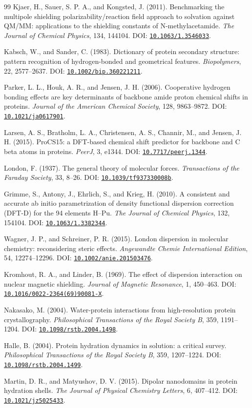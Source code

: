 \documentclass[11pt]{article}
\newcommand{\doi}[1]{\href{https://doi.org/#1}{\nolinkurl{#1}}}
\begin{document}
\begin{thebibliography}{99}
Kjaer, H., Sauer, S. P. A., and Kongsted, J. (2011).
Benchmarking the multipole shielding polarizability/reaction field approach
to solvation against QM/MM: applications to the shielding constants of
N-methylacetamide.
\emph{The Journal of Chemical Physics}, 134, 144104.
DOI: \doi{10.1063/1.3546033}.

Kabsch, W., and Sander, C. (1983).
Dictionary of protein secondary structure: pattern recognition of
hydrogen-bonded and geometrical features.
\emph{Biopolymers}, 22, 2577--2637.
DOI: \doi{10.1002/bip.360221211}.

Parker, L. L., Houk, A. R., and Jensen, J. H. (2006).
Cooperative hydrogen bonding effects are key determinants of backbone amide
proton chemical shifts in proteins.
\emph{Journal of the American Chemical Society}, 128, 9863--9872.
DOI: \doi{10.1021/ja0617901}.

Larsen, A. S., Bratholm, L. A., Christensen, A. S., Channir, M.,
and Jensen, J. H. (2015).
ProCS15: a DFT-based chemical shift predictor for backbone and C beta atoms
in proteins.
\emph{PeerJ}, 3, e1344.
DOI: \doi{10.7717/peerj.1344}.

London, F. (1937).
The general theory of molecular forces.
\emph{Transactions of the Faraday Society}, 33, 8--26.
DOI: \doi{10.1039/tf937330008b}.

Grimme, S., Antony, J., Ehrlich, S., and Krieg, H. (2010).
A consistent and accurate ab initio parametrization of density functional
dispersion correction (DFT-D) for the 94 elements H--Pu.
\emph{The Journal of Chemical Physics}, 132, 154104.
DOI: \doi{10.1063/1.3382344}.

Wagner, J. P., and Schreiner, P. R. (2015).
London dispersion in molecular chemistry: reconsidering steric effects.
\emph{Angewandte Chemie International Edition}, 54, 12274--12296.
DOI: \doi{10.1002/anie.201503476}.

Kromhout, R. A., and Linder, B. (1969).
The effect of dispersion interaction on nuclear magnetic shielding.
\emph{Journal of Magnetic Resonance}, 1, 450--463.
DOI: \doi{10.1016/0022-2364(69)90081-X}.

Nakasako, M. (2004).
Water-protein interactions from high-resolution protein crystallography.
\emph{Philosophical Transactions of the Royal Society B}, 359, 1191--1204.
DOI: \doi{10.1098/rstb.2004.1498}.

Halle, B. (2004).
Protein hydration dynamics in solution: a critical survey.
\emph{Philosophical Transactions of the Royal Society B}, 359, 1207--1224.
DOI: \doi{10.1098/rstb.2004.1499}.

Martin, D. R., and Matyushov, D. V. (2015).
Dipolar nanodomains in protein hydration shells.
\emph{The Journal of Physical Chemistry Letters}, 6, 407--412.
DOI: \doi{10.1021/jz5025433}.

\end{thebibliography}
\end{document}
